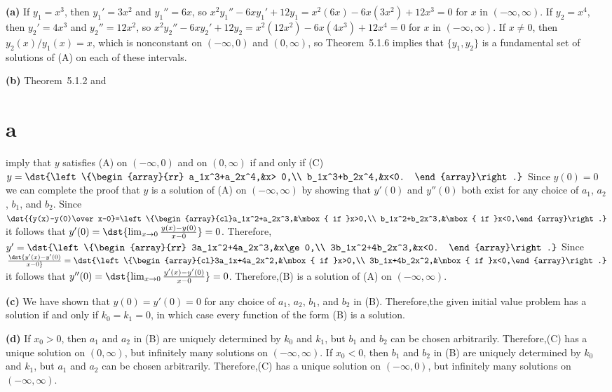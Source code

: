 \documentclass[dvips]{book}
\renewcommand{\exer}[1]{\par\medskip\;\noindent{\color{red}\bf #1.}}
\numberwithin{example}{section}
\numberwithin{equation}{section}
\numberwithin{theorem}{section}
\numberwithin{table}{section}
\numberwithin{figure}{section}
\begin{document}
\exer{5.1.44}
{\bf (a)}
 If $y_1=x^3$, then $y_1'=3x^2$ and $y_1''=6x$, so
$x^2y_1''-6xy_1'+12y_1=x^2(6x)-6x(3x^2)+12x^3=0$
for $x$ in $(-\infty,\infty)$.
 If $y_2=x^4$, then $y_2'=4x^3$ and $y_2''=12x^2$, so
$x^2y_2''-6xy_2'+12y_2=x^2(12x^2)-6x(4x^3)+12x^4=0$
for $x$ in $(-\infty,\infty)$.
If $x\ne0$, then $y_2(x)/y_1(x)=x$, which
is nonconstant on $(-\infty,0)$ and $(0,\infty)$, so
Theorem~5.1.6 implies that  $\{y_1,y_2\}$ is a fundamental
set of solutions of (A) on each of these intervals.

{\bf (b)}
 Theorem~5.1.2 and \part{a} imply that $y$ satisfies (A) on
$(-\infty,0)$ and on $(0,\infty)$ if and only if
(C) $y=\dst{\left\{\begin{array}{rr}
a_1x^3+a_2x^4,&x> 0,\\
b_1x^3+b_2x^4,&x<0.
\end{array}\right.}$
Since $y(0)=0$ we can  complete the proof that $y$ is
a solution of
(A) on $(-\infty,\infty)$ by showing
that $y'(0)$ and $y''(0)$ both exist for any choice of $a_1$, $a_2$,
$b_1$, and $b_2$. Since
$\dst{{y(x)-y(0)\over
x-0}=\left\{\begin{array}{cl}a_1x^2+a_2x^3,&\mbox{
if }x>0,\\ b_1x^2+b_2x^3,&\mbox{ if }x<0,\end{array}\right.}$ it
follows
that $y'(0)=\dst{\lim_{x\to0}{y(x)-y(0)\over x-0}}=0$. Therefore,
$y'=\dst{\left\{\begin{array}{rr}
3a_1x^2+4a_2x^3,&x\ge 0,\\
3b_1x^2+4b_2x^3,&x<0.
\end{array}\right.}$
Since
$\dst{y'(x)-y'(0)\over
x-0}=\dst{\left\{\begin{array}{cl}3a_1x+4a_2x^2,&\mbox{
if }x>0,\\ 3b_1x+4b_2x^2,&\mbox{ if }x<0,\end{array}\right.}$ it
follows that $y''(0)=\dst{\lim_{x\to0}{y'(x)-y'(0)\over x-0}}=0$.
Therefore,(B) is a solution of (A) on $(-\infty,\infty)$.

{\bf (c)} We have shown that $y(0)=y'(0)=0$ for any choice
of $a_1$, $a_2$, $b_1$, and $b_2$ in (B). Therefore,the given initial
value
problem has a solution if and only if $k_0=k_1=0$, in which case every
function of the form (B) is a solution.

{\bf (d)}  If $x_0>0$, then $a_1$ and $a_2$ in (B) are uniquely
determined by $k_0$ and $k_1$, but $b_1$ and $b_2$ can be chosen
arbitrarily. Therefore,(C) has a unique solution on
$(0,\infty)$, but infinitely many solutions on $(-\infty,\infty)$.
  If $x_0<0$, then $b_1$ and $b_2$ in (B) are uniquely
determined by $k_0$ and $k_1$, but $a_1$ and $a_2$ can be chosen
arbitrarily. Therefore,(C) has a unique solution on
$(-\infty,0)$, but infinitely many solutions on $(-\infty,\infty)$.
\end{document}
